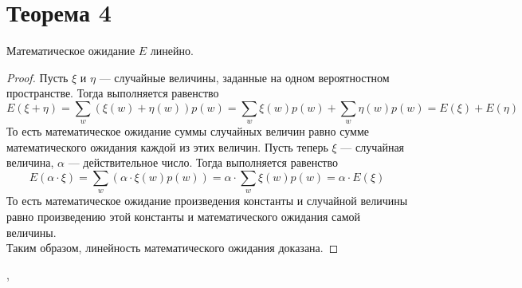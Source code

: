 \documentclass[a4paper,12pt]{article}
\begin{document}
	\section{Теорема 4}
	\begin{theorem}
		Математическое ожидание $E$ линейно.
	\end{theorem}
	\begin{proof}
	Пусть $\xi$ и $\eta$ --- случайные величины, заданные на одном вероятностном пространстве. Тогда выполняется равенство $$E(\xi+\eta)=\sum_w(\xi(w)+\eta(w))p(w)=\sum_w\xi(w)p(w)+\sum_w\eta(w)p(w)=E(\xi)+E(\eta)$$
	То есть математическое ожидание суммы случайных величин равно сумме математического ожидания каждой из этих величин. Пусть теперь $\xi$ --- случайная величина, $\alpha$ --- действительное число. Тогда выполняется равенство 
	$$E(\alpha\cdot\xi)=\sum_w(\alpha\cdot\xi(w)p(w))=\alpha\cdot\sum_w\xi(w)p(w)=\alpha\cdot E(\xi)$$
	То есть математическое ожидание произведения константы и случайной величины равно произведению этой константы и математического ожидания самой величины.\\
	Таким образом, линейность математического ожидания доказана.
	\end{proof}
\sep
\end{document}

